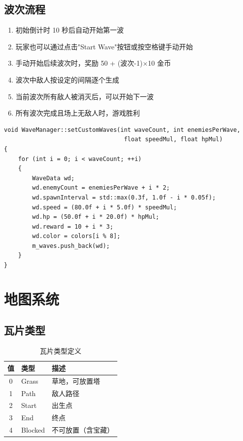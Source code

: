 \documentclass[12pt,a4paper]{ctexart}
\begin{document}
\subsection{波次流程}

\begin{enumerate}
    \item 初始倒计时 10 秒后自动开始第一波
    \item 玩家也可以通过点击"Start Wave"按钮或按空格键手动开始
    \item 手动开始后续波次时，奖励 50 + (波次-1)×10 金币
    \item 波次中敌人按设定的间隔逐个生成
    \item 当前波次所有敌人被消灭后，可以开始下一波
    \item 所有波次完成且场上无敌人时，游戏胜利
\end{enumerate}

\begin{lstlisting}[caption={WaveManager::setCustomWaves()——动态生成波次}]
void WaveManager::setCustomWaves(int waveCount, int enemiesPerWave,
                                  float speedMul, float hpMul)
{
    for (int i = 0; i < waveCount; ++i)
    {
        WaveData wd;
        wd.enemyCount = enemiesPerWave + i * 2;
        wd.spawnInterval = std::max(0.3f, 1.0f - i * 0.05f);
        wd.speed = (80.0f + i * 5.0f) * speedMul;
        wd.hp = (50.0f + i * 20.0f) * hpMul;
        wd.reward = 10 + i * 3;
        wd.color = colors[i % 8];
        m_waves.push_back(wd);
    }
}
\end{lstlisting}


\section{地图系统}

\subsection{瓦片类型}

\begin{table}[H]
    \centering
    \caption{瓦片类型定义}
    \begin{tabularx}{\textwidth}{clX}
        \toprule
        \textbf{值} & \textbf{类型} & \textbf{描述} \\
        \midrule
        0 & Grass  & 草地，可放置塔 \\
        1 & Path   & 敌人路径 \\
        2 & Start  & 出生点 \\
        3 & End    & 终点 \\
        4 & Blocked & 不可放置（含宝藏） \\
        \bottomrule
    \end{tabularx}
\end{table}
\end{document}
